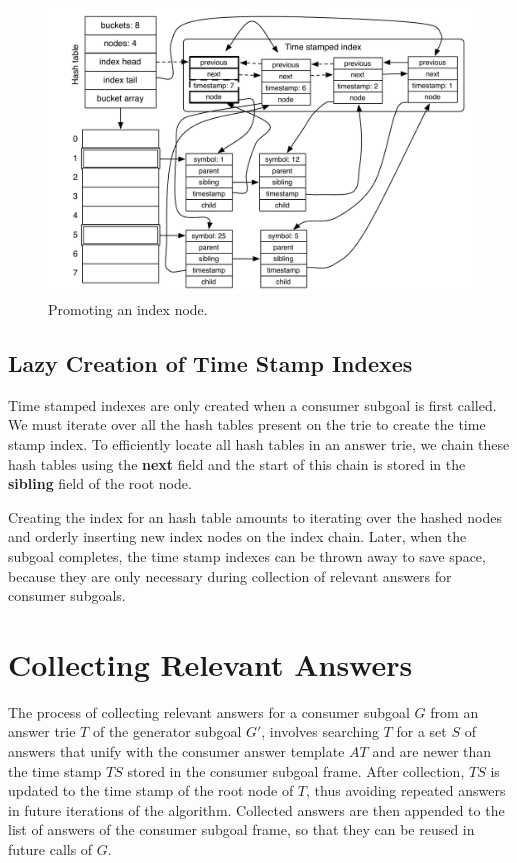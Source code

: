 \begin{figure}[ht]
  \centering
    \includegraphics[scale=0.6]{hash_table_promote.pdf}
  \caption{Promoting an index node.}
  \label{fig:hash_table_promote}
\end{figure}

\subsection{Lazy Creation of Time Stamp Indexes}

Time stamped indexes are only created when a consumer subgoal is first called.
We must iterate over all the hash tables present on the trie to create the time stamp index.
To efficiently locate all hash tables in an answer trie, we chain these hash tables
using the \textbf{next} field and the start of this chain is stored
in the \textbf{sibling} field of the root node.

Creating the index for an hash table amounts to iterating over the hashed nodes
and orderly inserting new index nodes on the index chain.
Later, when the subgoal completes, the time stamp indexes can be thrown away to save space,
because they are only necessary during collection of relevant answers for consumer subgoals.

\section{Collecting Relevant Answers}\label{sec:collect}

The process of collecting relevant answers for a consumer subgoal $G$ from an answer trie $T$
of the generator subgoal $G'$, involves searching $T$ for a set $S$ of answers that unify
with the consumer answer template $AT$ and are newer than the time stamp
$TS$ stored in the consumer subgoal frame. After collection, $TS$ is updated to the
time stamp of the root node of $T$, thus avoiding repeated answers in future iterations
of the algorithm. Collected answers are then appended to the list of answers of the consumer
subgoal frame, so that they can be reused in future calls of $G$.

